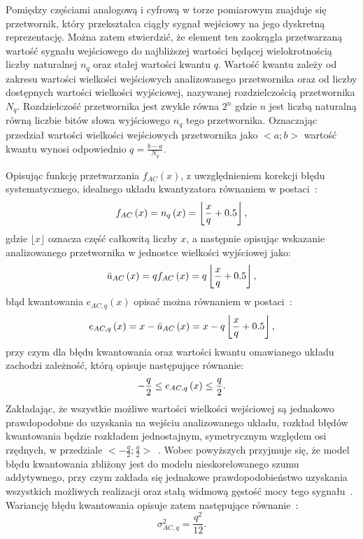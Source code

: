 Pomiędzy częściami analogową i cyfrową w torze pomiarowym znajduje się przetwornik, który przekształca ciągły sygnał wejściowy na jego dyskretną reprezentację. Można zatem stwierdzić, że element ten zaokrągla przetwarzaną wartość sygnału wejściowego do najbliższej wartości będącej wielokrotnością liczby naturalnej $n_{q}$ oraz stałej wartości kwantu $q$. Wartość kwantu zależy od zakresu wartości wielkości wejściowych analizowanego przetwornika oraz od liczby dostępnych wartości wielkości wyjściowej, nazywanej rozdzielczością przetwornika $N_{q}$. Rozdzielczość przetwornika jest zwykle równa $2^{n}$ gdzie $n$ jest liczbą naturalną równą liczbie bitów słowa wyjściowego $n_{q}$ tego przetwornika. Oznaczając przedział wartości wielkości wejściowych przetwornika jako $<a;b>$ wartość kwantu wynosi odpowiednio $q = \frac{b - a}{N_{q}}$.

Opisując funkcję przetwarzania $f_{AC}(x)$, z uwzględnieniem korekcji błędu systematycznego, idealnego układu kwantyzatora równaniem w postaci~\cite{jakubiec_system}:
\begin{equation}
f_{AC} \left(x\right) = n_{q} \left(x\right) = \left\lfloor \frac{x}{q} + 0.5 \right\rfloor \label{eq:adc_function},
\end{equation}
gdzie $\lfloor x \rfloor$ oznacza część całkowitą liczby $x$, a następnie opisując wskazanie analizowanego przetwornika w jednostce wielkości wyjściowej jako:
\begin{equation}
\breve{u}_{AC} \left(x\right) = q f_{AC} \left(x\right) = q \left\lfloor \frac{x}{q} + 0.5 \right\rfloor \label{eq:adc_output},
\end{equation}
błąd kwantowania $e_{AC,q}(x)$ opisać można równaniem w postaci~\cite{jakubiec_system}:
\begin{equation}
e_{AC,q} \left(x\right) = x - \breve{u}_{AC} \left(x\right) = x - q \left\lfloor \frac{x}{q} + 0.5 \right\rfloor \label{eq:adc_qerror},
\end{equation}
przy czym dla błędu kwantowania oraz wartości kwantu omawianego układu zachodzi zależność, którą opisuje następujące równanie:
\begin{equation}
-\frac{q}{2} \le e_{AC,q} \left(x\right) \le \frac{q}{2} \label{eq:adc_qerrrange}.
\end{equation}
Zakładając, że wszystkie możliwe wartości wielkości wejściowej są jednakowo prawdopodobne do uzyskania na wejściu analizowanego układu, rozkład błędów kwantowania będzie rozkładem jednostajnym, symetrycznym względem osi rzędnych, w przedziale $<-\frac{q}{2};\frac{q}{2}>$~\cite{jakubiec_system, sienkowski_kwant}. Wobec powyższych przyjmuje się, że model błędu kwantowania zbliżony jest do modelu nieskorelowanego szumu addytywnego, przy czym zakłada się jednakowe prawdopodobieństwo uzyskania wszystkich możliwych realizacji oraz stałą widmową gęstość mocy tego sygnału~\cite{gray_quantization, widrow_quantization}. Wariancję błędu kwantowania opisuje zatem następujące równanie~\cite{jcgm_guide}:
\begin{equation}
\sigma_{AC,q}^{2} = \frac{q^{2}}{12} \label{eq:adc_errvar}.
\end{equation}

